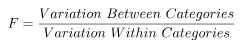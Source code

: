 \documentclass[preview]{standalone}
\begin{document}
\begin{align*}
\special{dvisvgm:raw <g id='unique000'>}F = \frac{Variation\ Between\ Categories}{Variation\ Within\ Categories}\special{dvisvgm:raw </g>}
\end{align*}
\end{document}
